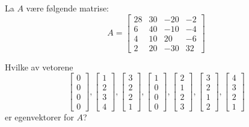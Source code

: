 \documentclass[11pt, a4paper, norsk]{NTNUoving}
\begin{document}
    \begin{oppgave}
        La $A$ være følgende matrise: $$A = \begin{bmatrix}
            28 & 30 & -20 & -2 \\
            6 & 40 & -10 & -4 \\
            4 & 10 & 20 & -6 \\
            2 & 20 & -30 & 32
        \end{bmatrix}$$

        \begin{punkt}
            Hvilke av vetorene $$\begin{bmatrix}
                0 \\
                0 \\
                0 \\
                0
            \end{bmatrix}, \begin{bmatrix}
                1 \\
                2 \\
                3 \\
                4
            \end{bmatrix}, \begin{bmatrix}
                3 \\
                2 \\
                2 \\
                1
            \end{bmatrix}, \begin{bmatrix}
                1 \\
                0 \\
                0 \\
                0
            \end{bmatrix}, \begin{bmatrix}
                2 \\
                1 \\
                2 \\
                3
            \end{bmatrix}, \begin{bmatrix}
                3 \\
                2 \\
                1 \\
                2
            \end{bmatrix}, \begin{bmatrix}
                4 \\
                3 \\
                2 \\
                1
            \end{bmatrix}$$ er egenvektorer for $A$?


\end{punkt}
\end{oppgave}
\end{document}

